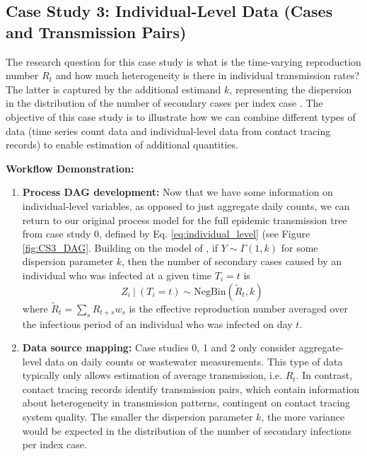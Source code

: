 \documentclass{article}
\begin{document}
\begin{enumerate}
\begin{enumerate}
        
\end{enumerate}

\subsection{Case Study 3: Individual-Level Data (Cases and Transmission Pairs)}

The research question for this case study is what is the time-varying reproduction number $R_t$ and how much heterogeneity is there in individual transmission rates? The latter is captured by the additional estimand $k$, representing the dispersion in the distribution of the number of secondary cases per index case \citep{lloyd2005superspreading}. The objective of this case study is to illustrate how we can combine different types of data (time series count data and individual-level data from contact tracing records) to enable estimation of additional quantities. 


\textbf{Workflow Demonstration:}
\begin{enumerate}
    \item \textbf{Process DAG development:} Now that we have some information on individual-level variables, as opposed to just aggregate daily counts, we can return to our original process model for the full epidemic transmission tree from case study 0, defined by Eq. \eqref{eq:individual_level} (see Figure \ref{fig:CS3_DAG}. 
    Building on the model of \citet{lloyd2005superspreading}, if $Y\sim \Gamma(1,k)$ for some dispersion parameter $k$, then the number of secondary cases caused by an individual who was infected at a given time $T_i=t$ is
     \begin{equation} \label{eq:offspring_dist}
        Z_i \ | \ (T_i=t) \sim \mathrm{NegBin}\left( \tilde{R}_{t}, k\right)
    \end{equation}   
    where $\tilde{R}_t= \sum_s R_{t+s} w_s$ is the effective reproduction number averaged over the infectious period of an individual who was infected on day $t$.
   
    \item \textbf{Data source mapping:} Case studies 0, 1 and 2 only consider aggregate-level data on daily counts or wastewater measurements. This type of data typically only allows estimation of average transmission, i.e. $R_t$. In contrast, contact tracing records identify transmission pairs, which contain information about heterogeneity in transmission patterns, contingent on contact tracing system quality. The smaller the dispersion parameter $k$, the more variance would be expected in the distribution of the number of secondary infections per index case.
    

\end{enumerate}
\end{enumerate}
\end{document}
